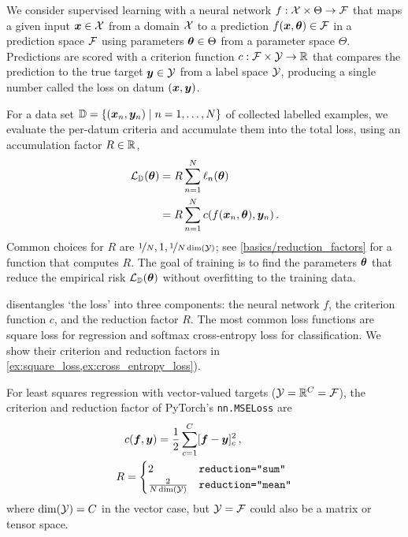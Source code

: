 We consider supervised learning with a neural network $f: {\mathcal{X}} \times \Theta \to {\mathcal{F}}$ that maps a given input ${\bm{x}} \in {\mathcal{X}}$ from a domain ${\mathcal{X}}$ to a prediction $f({\bm{x}}, {\bm{\theta}}) \in {\mathcal{F}}$ in a prediction space ${\mathcal{F}}$ using parameters ${\bm{\theta}} \in \Theta$ from a parameter space $\Theta$.
Predictions are scored with a criterion function $c: {\mathcal{F}} \times {\mathcal{Y}} \to {\mathbb{R}}$ that compares the prediction to the true target ${\bm{y}} \in {\mathcal{Y}}$ from a label space ${\mathcal{Y}}$, producing a single number called the loss on datum $({\bm{x}}, {\bm{y}})$.

For a data set ${\mathbb{D}} = \{({\bm{x}}_n, {\bm{y}}_n) \mid n=1, \dots, N\}$ of collected labelled examples, we evaluate the per-datum criteria and accumulate them into the total loss, using an accumulation factor $R \in {\mathbb{R}}$,
\begin{align}\label{eq:empirical_risk}
  \begin{split}
    {\mathcal{L}}_{{\mathbb{D}}}({\bm{\theta}}) & = R \sum_{n=1}^N \ell_n({\bm{\theta}})
    \\
                       & = R \sum_{n=1}^N c(f({\bm{x}}_n, {\bm{\theta}}), {\bm{y}}_n)\,.
  \end{split}
\end{align}
Common choices for $R$ are $\nicefrac{1}{N}, 1, \nicefrac{1}{N \dim({\mathcal{Y}})}$; see \cref{basics/reduction_factors} for a function that computes $R$.
The goal of training is to find the parameters ${\bm{\theta}}$ that reduce the empirical risk ${\mathcal{L}}_{{\mathbb{D}}}({\bm{\theta}})$ without overfitting to the training data.

 disentangles `the loss' into three components: the neural network $f$, the criterion function $c$, and the reduction factor $R$.
The most common loss functions are square loss for regression and softmax cross-entropy loss for classification.
We show their criterion and reduction factors in \cref{ex:square_loss,ex:cross_entropy_loss}).

\switchcolumn[1]
\begin{example}\label{ex:square_loss}
  For least squares regression with vector-valued targets (${\mathcal{Y}} = {\mathbb{R}}^C = {\mathcal{F}}$), the criterion and reduction factor of PyTorch's \texttt{nn.MSELoss} are
  \begin{align*}
    &c({\bm{f}}, {\bm{y}})
      =
      \frac{1}{2}\sum_{c=1}^C [{\bm{f}} - {\bm{y}}]_c^2\,,
    \\
    R
    &=
      \begin{cases}
        2                     & \text{\texttt{reduction="sum"}}
        \\
        \frac{2}{N \dim({\mathcal{Y}})} & \text{\texttt{reduction="mean"}}
      \end{cases}
  \end{align*}
  where $\dim({\mathcal{Y}}) = C$ in the vector case, but ${\mathcal{Y}} = {\mathcal{F}}$ could also be a matrix or tensor space.
\end{example}

